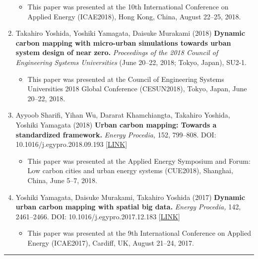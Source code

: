 \documentclass[]{book}
\providecommand{\tightlist}{%
  \setlength{\itemsep}{0pt}\setlength{\parskip}{0pt}}
\begin{document}
\begin{enumerate}
  \begin{itemize}
  \tightlist
  \item
    This paper was presented at the 10th International Conference on Applied Energy (ICAE2018), Hong Kong, China, August 22--25, 2018.
  \end{itemize}
\item
  Takahiro Yoshida, Yoshiki Yamagata, Daisuke Murakami (2018)
  \textbf{Dynamic carbon mapping with micro-urban simulations towards urban system design of near zero.}
  \emph{Proceedings of the 2018 Council of Engineering Systems Universities} (June 20--22, 2018; Tokyo, Japan), SU2-1.

  \begin{itemize}
  \tightlist
  \item
    This paper was presented at the Council of Engineering Systems Universities 2018 Global Conference (CESUN2018), Tokyo, Japan, June 20--22, 2018.
  \end{itemize}
\item
  Ayyoob Sharifi, Yihan Wu, Dararat Khamchiangta, Takahiro Yoshida, Yoshiki Yamagata (2018)
  \textbf{Urban carbon mapping: Towards a standardized framework.}
  \emph{Energy Procedia,} 152, 799--808.
  DOI: 10.1016/j.egypro.2018.09.193 {[}\href{https://www.sciencedirect.com/science/article/pii/S1876610218307379}{LINK}{]}

  \begin{itemize}
  \tightlist
  \item
    This paper was presented at the Applied Energy Symposium and Forum: Low carbon cities and urban energy systems (CUE2018), Shanghai, China, June 5--7, 2018.
  \end{itemize}
\item
  Yoshiki Yamagata, Daisuke Murakami, Takahiro Yoshida (2017)
  \textbf{Dynamic urban carbon mapping with spatial big data.}
  \emph{Energy Procedia,} 142, 2461--2466.
  DOI: 10.1016/j.egypro.2017.12.183 {[}\href{https://www.sciencedirect.com/science/article/pii/S1876610217359131}{LINK}{]}

  \begin{itemize}
  \tightlist
  \item
    This paper was presented at the 9th International Conference on Applied Energy (ICAE2017), Cardiff, UK, August 21--24, 2017.
  \end{itemize}
\end{enumerate}

\begin{center}\rule{0.5\linewidth}{\linethickness}\end{center}
\end{document}
